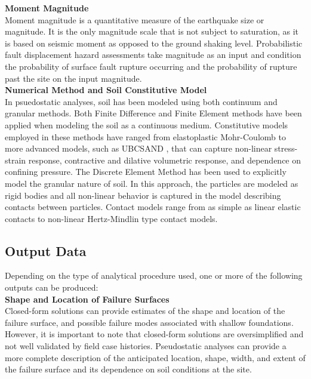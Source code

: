 \noindent\textbf{Moment Magnitude}\\
Moment magnitude is a quantitative measure of the earthquake size or magnitude. It is the only magnitude scale that is not subject to saturation, as it is based on seismic moment as opposed to the ground shaking level. Probabilistic fault displacement hazard assessments take magnitude as an input and condition the probability of surface fault rupture occurring and the probability of rupture past the site on the input magnitude.\\

\noindent\textbf{Numerical Method and Soil Constitutive Model}\\
In psuedostatic analyses, soil has been modeled using both continuum and granular methods. Both Finite Difference and Finite Element methods have been applied when modeling the soil as a continuous medium. Constitutive models employed in these methods have ranged from elastoplastic Mohr-Coulomb to more advanced models, such as UBCSAND \citep{byrne2004numerical}, that can capture non-linear stress-strain response, contractive and dilative volumetric response, and dependence on confining pressure. The Discrete Element Method has been used to explicitly model the granular nature of soil. In this approach, the particles are modeled as rigid bodies and all non-linear behavior is captured in the model describing contacts between particles. Contact models range from as simple as linear elastic contacts to non-linear Hertz-Mindlin type contact models.\\

\subsection{Output Data}
Depending on the type of analytical procedure used, one or more of the following outputs can be produced:\\[0.5em]

\noindent\textbf{Shape and Location of Failure Surfaces}\\
Closed-form solutions can provide estimates of the shape and location of the failure surface, and possible failure modes associated with shallow foundations. However, it is important to note that closed-form solutions are oversimplified and not well validated by field case histories. Pseudostatic analyses can provide a more complete description of the anticipated location, shape, width, and extent of the failure surface and its dependence on soil conditions at the site.\\ %

